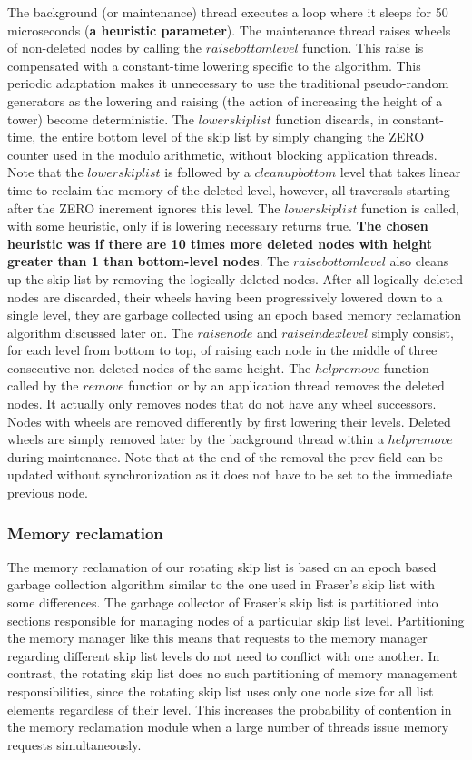 \documentclass{article}
\begin{document}
The background (or maintenance) thread executes a loop where it sleeps for 50 microseconds (\textbf{a heuristic parameter}). The maintenance thread raises wheels of non-deleted nodes by calling the $raise bottom level$ function. This raise is compensated with a constant-time lowering specific to the algorithm. This periodic adaptation makes it unnecessary to use the traditional pseudo-random generators as the lowering and raising (the action of increasing the height of a tower) become deterministic. The $lower skiplist$ function discards, in constant-time, the entire bottom level of the skip list by simply changing the ZERO counter used in the modulo arithmetic, without blocking application threads. Note that the $lower skiplist$ is followed by a $cleanup bottom$ level that takes linear time to reclaim the memory of the deleted level, however, all traversals starting after the ZERO increment ignores this level. The $lower skiplist$ function is called, with some heuristic, only if is lowering necessary returns true. \textbf{The chosen heuristic was if there are 10 times more deleted nodes with height greater than 1 than bottom-level nodes}. The $raise bottom level$ also cleans up the skip list by removing the logically deleted nodes. After all logically deleted nodes are discarded, their wheels having been progressively lowered down to a single level, they are garbage collected using an epoch based memory reclamation algorithm discussed later on. The $raise node$ and $raise index level$ simply consist, for each level from bottom to top, of raising each node in the middle of three consecutive non-deleted nodes of the same height. The $help remove$ function called by the $remove$ function or by an application thread removes the deleted nodes. It actually only removes nodes that do not have any wheel successors. Nodes with wheels are removed differently by first lowering their levels. Deleted wheels are simply removed later by the background thread within a $help remove$ during maintenance. Note that at the end of the removal the prev field can be updated without synchronization as it does not have to be set to the immediate previous node.

\subsubsection{Memory reclamation}
\label{ssec:mr}

The memory reclamation of our rotating skip list is based on an epoch based garbage collection algorithm similar to the one used in Fraser’s skip list \cite{C4} with some differences. The garbage collector of Fraser’s skip list is partitioned into sections responsible for managing nodes of a particular skip list level. Partitioning the memory manager like this means that requests to the memory manager regarding different skip list levels do not need to conflict with one another. In contrast, the rotating skip list does no such partitioning of memory management responsibilities, since the rotating skip list uses only one node size for all list elements regardless of their level. This increases the probability of contention in the memory reclamation module when a large number of threads issue memory requests simultaneously.
\end{document}
